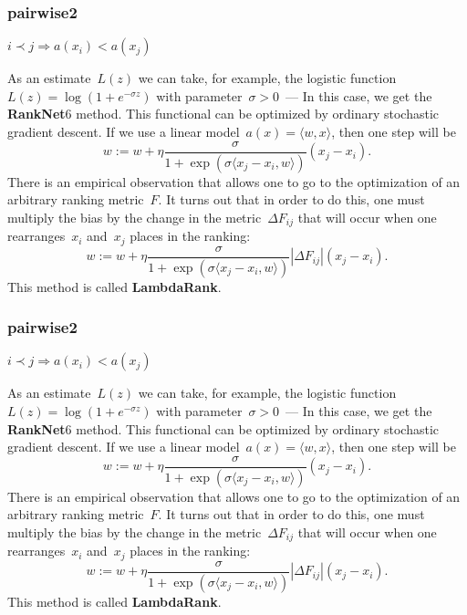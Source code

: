 \documentclass{beamer}
\begin{document}
\begin{frame}
\frametitle{pairwise2}

\begin{center}
    $ i \prec j \Rightarrow a(x_i) < a(x_j) $
\end{center}

As an estimate~$L(z)$ we can take, for example, the logistic function~$L(z) = \log(1 + e^{-\sigma z})$ with parameter~$\sigma > 0$~---
In this case, we get the \textbf{RankNet}6 method.
This functional can be optimized by ordinary stochastic gradient descent.
If we use a linear model~$a(x) = \langle w, x \rangle$, then one step will be
\[
    w
    :=
    w
    +
    \eta
    \frac{
        \sigma
    }{
        1 + \exp(
            \sigma
            \langle x_j - x_i, w \rangle
        )
    }
    (x_j - x_i).
\]
There is an empirical observation that allows one to go to the optimization of an arbitrary ranking metric~$F$.
It turns out that in order to do this, one must multiply the bias by the change in the metric~$\Delta F_{ij}$ that will occur when one rearranges~$x_i$ and~$x_j$
places in the ranking:
\[
    w
    :=
    w
    +
    \eta
    \frac{
        \sigma
    }{
        1 + \exp(
            \sigma
            \langle x_j - x_i, w \rangle
        )
    }
    |\Delta F_{ij}|
    (x_j - x_i).
\]
This method is called \textbf{LambdaRank}.
\end{frame}

\begin{frame}
\frametitle{pairwise2}

\begin{center}
    $ i \prec j \Rightarrow a(x_i) < a(x_j) $
\end{center}

As an estimate~$L(z)$ we can take, for example, the logistic function~$L(z) = \log(1 + e^{-\sigma z})$ with parameter~$\sigma > 0$~---
In this case, we get the \textbf{RankNet}6 method.
This functional can be optimized by ordinary stochastic gradient descent.
If we use a linear model~$a(x) = \langle w, x \rangle$, then one step will be
\[
    w
    :=
    w
    +
    \eta
    \frac{
        \sigma
    }{
        1 + \exp(
            \sigma
            \langle x_j - x_i, w \rangle
        )
    }
    (x_j - x_i).
\]
There is an empirical observation that allows one to go to the optimization of an arbitrary ranking metric~$F$.
It turns out that in order to do this, one must multiply the bias by the change in the metric~$\Delta F_{ij}$ that will occur when one rearranges~$x_i$ and~$x_j$
places in the ranking:
\[
    w
    :=
    w
    +
    \eta
    \frac{
        \sigma
    }{
        1 + \exp(
            \sigma
            \langle x_j - x_i, w \rangle
        )
    }
    |\Delta F_{ij}|
    (x_j - x_i).
\]
This method is called \textbf{LambdaRank}.
\end{frame}
\end{document}
